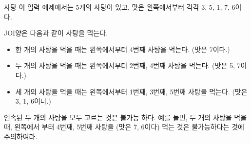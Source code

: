 \begin{problem}{사탕}
	이 입력 예제에서는 5개의 사탕이 있고, 맛은 왼쪽에서부터 각각 3, 5, 1, 7, 6이다.
	
	JOI양은 다음과 같이 사탕을 먹는다.
	
	\begin{itemize}
		\item 한 개의 사탕을 먹을 때는 왼쪽에서부터 4번째 사탕을 먹는다. (맛은 7이다.)
		\item 두 개의 사탕을 먹을 때는 왼쪽에서부터 2번째, 4번째 사탕을 먹는다. (맛은 5, 7이다.)
		\item 세 개의 사탕을 먹을 때는 왼쪽에서부터 1번째, 3번째, 5번째 사탕을 먹는다. (맛은 3, 1, 6이다.)
	\end{itemize}

	연속된 두 개의 사탕을 모두 고르는 것은 불가능 하다. 예를 들면, 두 개의 사탕을 먹을 때, 왼쪽에서 부터 4번째, 5번째 사탕을 (맛은 7, 6이다) 먹는 것은 불가능하다는 것에 주의하여라.
	
	\begin{example}
	\end{example}
	
	
\end{problem}

